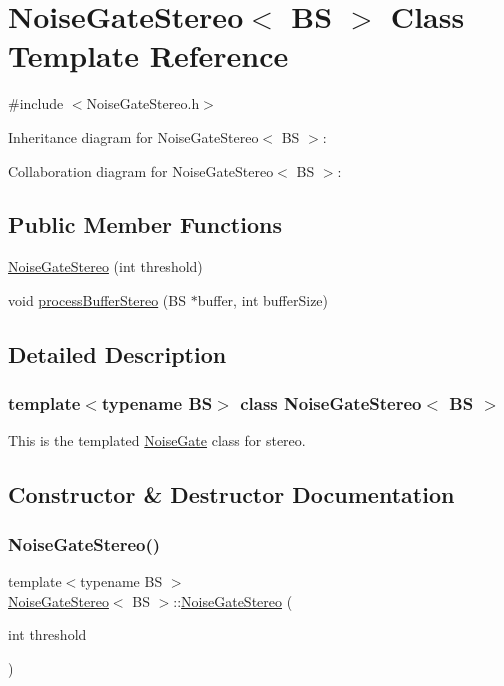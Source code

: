 \hypertarget{classNoiseGateStereo}{}\section{Noise\+Gate\+Stereo$<$ BS $>$ Class Template Reference}
\label{classNoiseGateStereo}


{\ttfamily \#include $<$Noise\+Gate\+Stereo.\+h$>$}



Inheritance diagram for Noise\+Gate\+Stereo$<$ BS $>$\+:


Collaboration diagram for Noise\+Gate\+Stereo$<$ BS $>$\+:
\subsection*{Public Member Functions}
\begin{DoxyCompactItemize}
\item 
\hyperlink{classNoiseGateStereo_ae2e8a4417ebc375e6e20ac58446e3e52}{Noise\+Gate\+Stereo} (int threshold)
\item 
void \hyperlink{classNoiseGateStereo_a4b084863de9b3c138f4c1f8b30e70c6e}{process\+Buffer\+Stereo} (BS $\ast$buffer, int buffer\+Size)
\end{DoxyCompactItemize}


\subsection{Detailed Description}
\subsubsection*{template$<$typename BS$>$\newline
class Noise\+Gate\+Stereo$<$ B\+S $>$}

This is the templated \hyperlink{classNoiseGate}{Noise\+Gate} class for stereo. 

\subsection{Constructor \& Destructor Documentation}
\mbox{\label{classNoiseGateStereo_ae2e8a4417ebc375e6e20ac58446e3e52}} 
\subsubsection{\texorpdfstring{Noise\+Gate\+Stereo()}{NoiseGateStereo()}}
{\footnotesize\ttfamily template$<$typename BS $>$ \\
\hyperlink{classNoiseGateStereo}{Noise\+Gate\+Stereo}$<$ BS $>$\+::\hyperlink{classNoiseGateStereo}{Noise\+Gate\+Stereo} (\begin{DoxyParamCaption}\item[{int}]{threshold }\end{DoxyParamCaption})}

